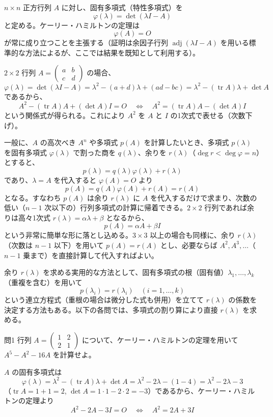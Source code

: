 \documentclass[a4paper,11pt]{article}
\begin{document}


\noindent
$n \times n$ 正方行列 $A$ に対し、固有多項式（特性多項式）を
\[
\varphi(\lambda) = \det(\lambda I - A)
\]
と定める。ケーリー・ハミルトンの定理は
\[
\varphi(A) = O
\]
が常に成り立つことを主張する（証明は余因子行列 $\operatorname{adj}(\lambda I - A)$ を用いる標準的な方法によるが、ここでは結果を既知として利用する）。

$2 \times 2$ 行列 $A = \begin{pmatrix} a & b \\ c & d \end{pmatrix}$ の場合、
\[
\varphi(\lambda) = \det(\lambda I - A) = \lambda^{2} - (a+d)\lambda + (ad - bc) = \lambda^{2} - (\operatorname{tr} A)\lambda + \det A
\]
であるから、
\[
A^{2} - (\operatorname{tr} A) A + (\det A) I = O
\quad\Longleftrightarrow\quad
A^{2} = (\operatorname{tr} A)A - (\det A) I
\]
という関係式が得られる。これにより $A^{2}$ を $A$ と $I$ の1次式で表せる（次数下げ）。

一般に、$A$ の高次べき $A^{n}$ や多項式 $p(A)$ を計算したいとき、多項式 $p(\lambda)$ を固有多項式 $\varphi(\lambda)$ で割った商を $q(\lambda)$、余りを $r(\lambda)$（$\deg r < \deg \varphi = n$）とすると、
\[
p(\lambda) = q(\lambda)\varphi(\lambda) + r(\lambda)
\]
であり、$\lambda = A$ を代入すると $\varphi(A) = O$ より
\[
p(A) = q(A)\varphi(A) + r(A) = r(A)
\]
となる。すなわち $p(A)$ は余り $r(\lambda)$ に $A$ を代入するだけで求まり、次数の低い（$n-1$ 次以下の）行列多項式の計算に帰着できる。$2\times 2$ 行列であれば余りは高々1次式 $r(\lambda) = \alpha\lambda + \beta$ となるから、
\[
p(A) = \alpha A + \beta I
\]
という非常に簡単な形に落とし込める。$3\times 3$ 以上の場合も同様に、余り $r(\lambda)$（次数は $n-1$ 以下）を用いて $p(A) = r(A)$ とし、必要ならば $A^{2}, A^{3}, \dots$（$n-1$ 乗まで）を直接計算して代入すればよい。

余り $r(\lambda)$ を求める実用的な方法として、固有多項式の根（固有値）$\lambda_{1}, \dots, \lambda_{k}$（重複を含む）を用いて
\[
p(\lambda_{i}) = r(\lambda_{i}) \quad (i = 1, \dots, k)
\]
という連立方程式（重根の場合は微分した式も併用）を立てて $r(\lambda)$ の係数を決定する方法もある。以下の各問では、多項式の割り算により直接 $r(\lambda)$ を求める。

\clearpage
\begin{mondaiboxS}{問1}
行列 $A = \begin{pmatrix} 1 & 2 \\ 2 & 1 \end{pmatrix}$ について、ケーリー・ハミルトンの定理を用いて $A^{5} - A^{2} - 16A$ を計算せよ。
\end{mondaiboxS}
\kaitou
$A$ の固有多項式は
\[
\varphi(\lambda) = \lambda^{2} - (\operatorname{tr} A)\lambda + \det A = \lambda^{2} - 2\lambda - (1 - 4) = \lambda^{2} - 2\lambda - 3
\]
（$\operatorname{tr} A = 1+1=2$, $\det A = 1\cdot1 - 2\cdot2 = -3$）であるから、ケーリー・ハミルトンの定理より
\[
A^{2} - 2A - 3I = O \quad\Longleftrightarrow\quad A^{2} = 2A + 3I
\]
\end{document}

